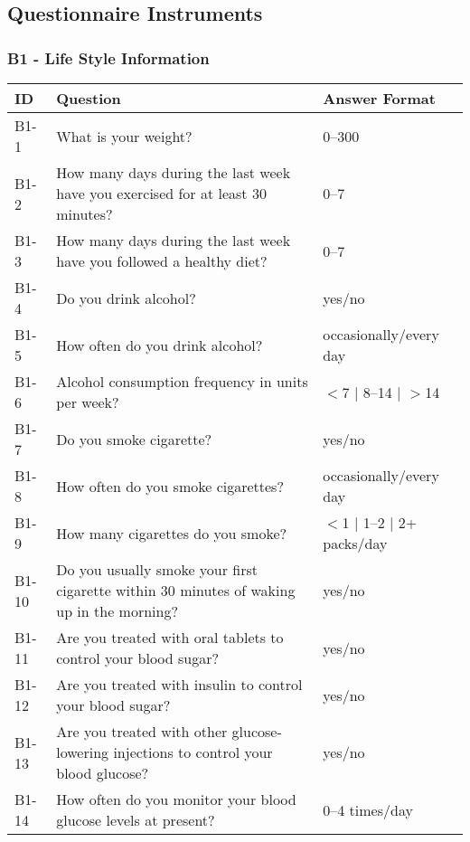 \subsection{Questionnaire Instruments}\label{sec:questionnaire-instruments}

\subsubsection{B1 - Life Style Information}\label{sec:B1-life-style}
\begin{table}[H]
    \centering
    \renewcommand{\arraystretch}{1.2}
    \begin{tabularx}{\textwidth}{|l|X|l|}
        \hline
        \textbf{ID} & \textbf{Question} & \textbf{Answer Format} \\ \hline
        B1-1  & What is your weight? & 0--300 \\ \hline
        B1-2  & How many days during the last week have you exercised for at least 30 minutes? & 0--7 \\ \hline
        B1-3  & How many days during the last week have you followed a healthy diet? & 0--7 \\ \hline
        B1-4  & Do you drink alcohol? & yes/no \\ \hline
        B1-5  & How often do you drink alcohol? & occasionally/every day \\ \hline
        B1-6  & Alcohol consumption frequency in units per week? & $<$7 $\mid$ 8--14 $\mid$ $>$14 \\ \hline
        B1-7  & Do you smoke cigarette? & yes/no \\ \hline
        B1-8  & How often do you smoke cigarettes? & occasionally/every day \\ \hline
        B1-9  & How many cigarettes do you smoke? & $<$1 $\mid$ 1--2 $\mid$ 2+ packs/day \\ \hline
        B1-10 & Do you usually smoke your first cigarette within 30 minutes of waking up in the morning? & yes/no \\ \hline
        B1-11 & Are you treated with oral tablets to control your blood sugar? & yes/no \\ \hline
        B1-12 & Are you treated with insulin to control your blood sugar? & yes/no \\ \hline
        B1-13 & Are you treated with other glucose-lowering injections to control your blood glucose? & yes/no \\ \hline
        B1-14 & How often do you monitor your blood glucose levels at present? & 0--4 times/day \\ \hline

\end{tabularx}
\end{table}
